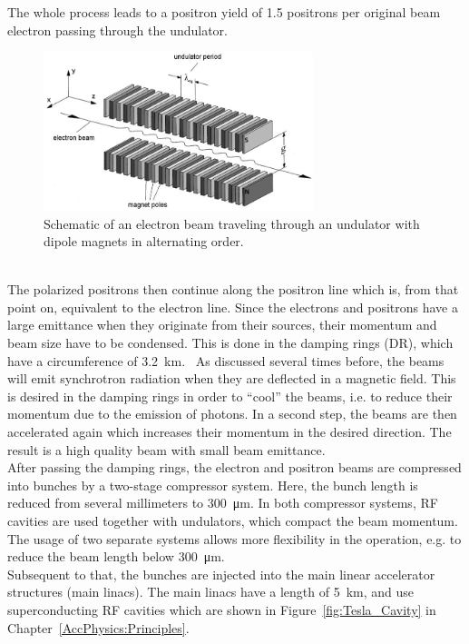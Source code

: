 The whole process leads to a positron yield of 1.5 positrons per original beam electron passing through the undulator.~\cite{Ushakov}
\begin{figure}
\centering
\includegraphics[width=0.7\textwidth]{Figures/Undulator_edited.png}
\caption[Schematic layout of an undulator]{Schematic of an electron beam traveling through an undulator with dipole magnets in alternating order.~\cite[based on p. 41]{Wille}}
\label{fig:Undulator}
\end{figure}
\\
The polarized positrons then continue along the positron line which is, from that point on, equivalent to the electron line.
Since the electrons and positrons have a large emittance when they originate from their sources, their momentum and beam size have to be condensed.
This is done in the damping rings (DR), which have a circumference of \SI{3.2}{\kilo\meter}.~\cite[p. 14]{TDR32}
As discussed several times before, the beams will emit synchrotron radiation when they are deflected in a magnetic field.
This is desired in the damping rings in order to ``cool'' the beams, i.e. to reduce their momentum due to the emission of photons.
In a second step, the beams are then accelerated again which increases their momentum in the desired direction.
The result is a high quality beam with small beam emittance.\\
After passing the damping rings, the electron and positron beams are compressed into bunches by a two-stage compressor system.
Here, the bunch length is reduced from several millimeters to \SI{300}{\micro\meter}.
In both compressor systems, RF cavities are used together with undulators, which compact the beam momentum.
The usage of two separate systems allows more flexibility in the operation, e.g. to reduce the beam length below \SI{300}{\micro\meter}.~\cite[p. 124]{TDR32}\\
Subsequent to that, the bunches are injected into the main linear accelerator structures (main linacs).
The main linacs have a length of \SI{5}{\kilo\meter}, and use superconducting RF cavities which are shown in Figure~\ref{fig:Tesla_Cavity} in Chapter~\ref{AccPhysics:Principles}. 
